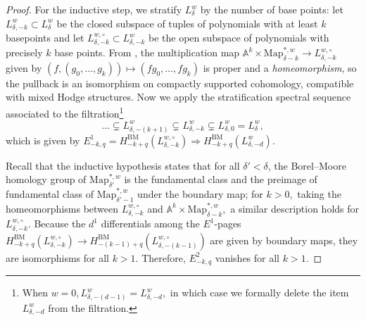 \documentclass[12pt,reqno]{amsart}
\theoremstyle{definition}
\theoremstyle{definition}
\theoremstyle{definition}
\theoremstyle{definition}
\begin{document}
\begin{proof}
  For the inductive step, we stratify $L_{\delta}^{w}$ by the number of base points: let $L_{\delta, -k}^{w}\subset L_{\delta}^{w}$ be the closed subspace of tuples of polynomials with at least $k$ basepoints and let $L_{\delta, -k}^{w, \circ}\subset L_{\delta, -k}^{w}$ be the open subspace of polynomials with precisely $k$ base points. From \cite[§3]{farbwolf}, the multiplication map $\mathbb{A}^k\times \mathrm{Map}_{\delta-k}^{*, w}\to L_{\delta, -k}^{w, \circ}$ given by $(f, (g_0, \dots, g_k))\mapsto (fg_0,\dots, fg_k)$ is proper and a \textit{homeomorphism}, so the pullback is an isomorphism on compactly supported cohomology, compatible with mixed Hodge structures. Now we apply the stratification spectral sequence associated to the filtration\footnote{When $w = 0,L_{\delta, -(d-1)}^{w} = L_{\delta, -d}^w,$ in which case we formally delete the item $L_{\delta, -d}^w$ from the  filtration.} $$\dots \subsetneq L_{\delta, -(k+1)}^w\subsetneq L_{\delta, -k}^w\subsetneq L_{\delta, 0}^w = L_{\delta}^{w},$$ which is given by $E^1_{-k, q} = H^{\mathrm{BM}}_{-k+q}(L_{\delta, -k}^{w,\circ})\Rightarrow H^{\mathrm{BM}}_{-k+q}(L_{\delta, -d}^w).$ 
  
  Recall that the inductive hypothesis states that for all $\delta'<\delta$, the Borel--Moore homology group of $\mathrm{Map}_{\delta'}^{*, w}$ is the fundamental class and the preimage of fundamental class of $\mathrm{Map}_{\delta'-1}^{*, w}$ under the boundary map; for $k>0,$ taking the homeomorphisms between $L_{\delta, -k}^{w, \circ}$ and $\mathbb{A}^k\times \mathrm{Map}_{\delta-k}^{*, w},$ a similar description holds for $L_{\delta, -k}^{w, \circ}.$ Because the $d^1$ differentials among the $E^1$-pages $H^{\mathrm{BM}}_{-k+q}(L_{\delta, -k}^{w,\circ})\to H^{\mathrm{BM}}_{-(k-1)+q}(L_{\delta, -(k-1)}^{w,\circ})$ are given by boundary maps, they are isomorphisms for all $k>1.$ Therefore, $E^2_{-k, q}$ vanishes for all $k>1.$
  

\end{proof}
\end{document}
